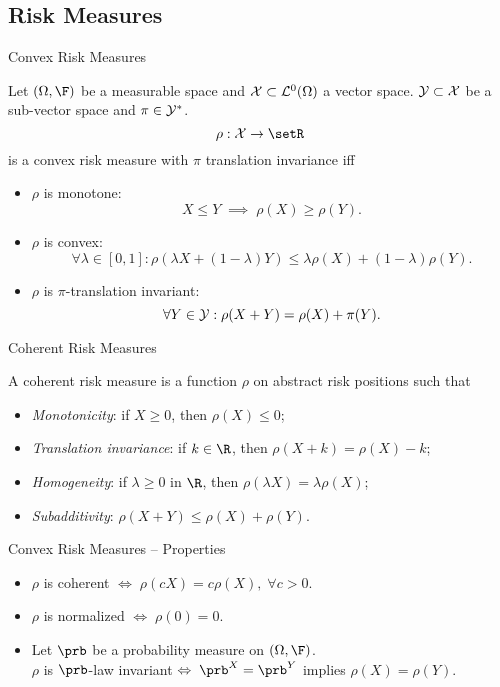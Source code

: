 \subsection{Risk Measures}

{Convex Risk Measures}

Let $(\Omega, \F)$ be a measurable space and ${\cal X} \subset {\cal L}^0(\Omega)$ a vector space. ${\cal Y} \subset {\cal X}$ be a sub-vector space and
$\pi \in {\cal Y}^*$.
\begin{equation}
\rho: {\cal X} \rightarrow \setR
\end{equation}
is a convex risk measure with $\pi$ translation invariance iff
\begin{itemize}
\item $\rho$ is monotone: $$X \leq Y \;  \implies \; \rho(X) \geq \rho(Y).$$
\item $\rho$ is convex: $$\forall \lambda \in [0,1]: \rho(\lambda X + (1-\lambda) Y) \leq \lambda \rho(X) + (1-\lambda) \rho(Y).$$
\item $\rho$ is $\pi$-translation invariant: $$\forall Y \in {\cal Y}: \rho(X+Y) = \rho(X) + \pi(Y).$$
\end{itemize}

{Coherent Risk Measures}

A coherent risk measure is a function $\rho$ on abstract risk positions such that
\begin{itemize}
\item<1-> \emph{Monotonicity}: if $X\geq 0$, then $\rho(X)\leq 0$;
\item<2-> \emph{Translation invariance}: if $k \in \R$, then
$\rho(X+k)=\rho(X)-k$;
\item<3-> \emph{Homogeneity}: if $\lambda \geq 0$ in $\R$, then $\rho(\lambda X)
= \lambda \rho (X)$;
\item<4-> \emph{Subadditivity}: $\rho(X+Y)\leq \rho(X)+\rho(Y)$.
\end{itemize}

{Convex Risk Measures -- Properties}

\begin{itemize}
\item $\rho$ is coherent $\Leftrightarrow \; \rho(cX) = c \rho(X), \; \forall c>0$.
\item $\rho$ is normalized $\Leftrightarrow \; \rho(0) = 0$.
\item Let $\prb$ be a probability measure on $(\Omega, \F)$.\\
$\rho$ is $\prb$-law invariant $\Leftrightarrow \; \prb^X = \prb^Y $ implies $\rho(X) = \rho(Y)$.
\end{itemize}

